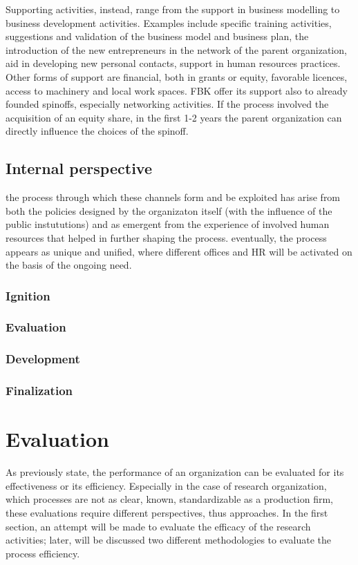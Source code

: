 Supporting activities, instead, range from the support in business modelling to business development activities. Examples include specific training activities, suggestions and validation of the business model and business plan, the introduction of the new entrepreneurs in the network of the parent organization, aid in developing new personal contacts, support in human resources practices. Other forms of support are financial, both in grants or equity, favorable licences, access to machinery and local work spaces. FBK offer its support also to already founded spinoffs, especially networking activities. If the process involved the acquisition of an equity share, in the first 1-2 years the parent organization can directly influence the choices of the spinoff.

\subsection{Internal perspective}

the process through which these channels form and be exploited has arise from both the policies designed by the organizaton itself (with the influence of the public instututions) and as emergent from the experience of involved human resources that helped in further shaping the process. eventually, the process appears as unique and unified, where different offices and HR will be activated on the basis of the ongoing need. 

\subsubsection{Ignition}
\subsubsection{Evaluation}
\subsubsection{Development}
\subsubsection{Finalization}

\section{Evaluation}

As previously state, the performance of an organization can be evaluated for its effectiveness or its efficiency. Especially in the case of research organization, which processes are not as clear, known, standardizable as a production firm, these evaluations require different perspectives, thus approaches. In the first section, an attempt will be made to evaluate the efficacy of the research activities; later, will be discussed two different methodologies to evaluate the process efficiency. 

